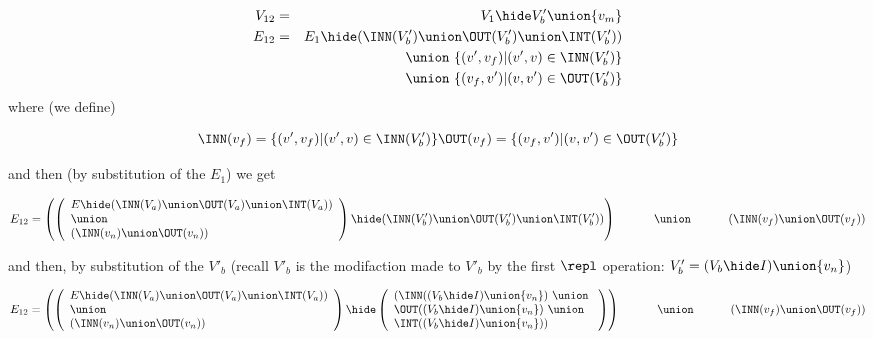 \begin{eqnarray*}
  V_{12} & = & V_1 \hide V'_b \union \{v_m\} \\
  E_{12} &  = & E_1\hide ( \INN(V'_b) \union \OUT(V'_b) \union \INT(V'_b) )\\
  && \union\ \{(v',v_{f})|(v',v) \in \INN(V'_b) \}\\
  && \union\ \{(v_{f},v')|(v,v') \in \OUT(V'_b) \}\\
\end{eqnarray*}
\noindent
where (we define) 

\[
 \INN(v_f) = \{(v',v_f)|(v',v) \in \INN(V'_b) \}\\
 \OUT(v_f) = \{(v_f,v')|(v,v') \in \OUT(V'_b) \}
 \]

  

\noindent
and then (by substitution of the $E_1$) we get

\[
E_{12}  =  \left( \left(
\begin{array}{l}  E\hide(\INN(V_a) \union \OUT(V_a) \union \INT(V_a)) \\  \union \\ (\INN(v_n) \union \OUT(v_n) ) \\
\end{array} \right)
   \hide ( \INN(V'_b) \union \OUT(V'_b) \union \INT(V'_b) ) \right) \\
\hphantom{E_{12}  = \;\; }   \union\ \\
\hphantom{E_{12}  = \;\;}   (\INN(v_f) \union \OUT(v_f))\\ 
\]



\noindent
and then, by substitution of the $V'_b$ (recall $V'_b$ is the modifaction made to $V'_b$ by the first $\repl$ operation: $V'_b = (V_b\hide I)\union\{v_{n}\}$)

\[
E_{12}  =  \left( \left(
\begin{array}{l}  E\hide(\INN(V_a) \union \OUT(V_a) \union \INT(V_a)) \\  \union \\ (\INN(v_n) \union \OUT(v_n) ) \\
\end{array} \right)
\hide    \left( \begin{array}{l}
  ( \INN((V_b\hide I)\union\{v_{n}\})~ \union\ \\ \OUT((V_b\hide I)\union\{v_{n}\})~ \union\ \\ \INT((V_b\hide I)\union\{v_n\}) ) 
         \end{array}
         \right) \right) \\
\hphantom{E_{12}  = \;\; }   \union\ \\
\hphantom{E_{12}  = \;\;}   (\INN(v_f) \union \OUT(v_f))\\ 
\]

